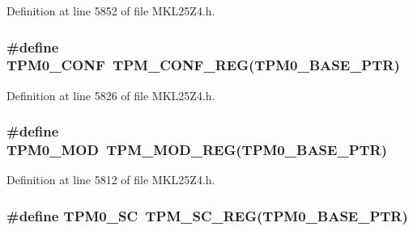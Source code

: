 Definition at line 5852 of file M\+K\+L25\+Z4.\+h.

\subsubsection[{\texorpdfstring{T\+P\+M0\+\_\+\+C\+O\+NF}{TPM0_CONF}}]{\setlength{\rightskip}{0pt plus 5cm}\#define T\+P\+M0\+\_\+\+C\+O\+NF~{\bf T\+P\+M\+\_\+\+C\+O\+N\+F\+\_\+\+R\+EG}({\bf T\+P\+M0\+\_\+\+B\+A\+S\+E\+\_\+\+P\+TR})}\hypertarget{group___t_p_m___register___accessor___macros_ga09ef091e6829f91a568ccc60793f802b}{}\label{group___t_p_m___register___accessor___macros_ga09ef091e6829f91a568ccc60793f802b}


Definition at line 5826 of file M\+K\+L25\+Z4.\+h.

\subsubsection[{\texorpdfstring{T\+P\+M0\+\_\+\+M\+OD}{TPM0_MOD}}]{\setlength{\rightskip}{0pt plus 5cm}\#define T\+P\+M0\+\_\+\+M\+OD~{\bf T\+P\+M\+\_\+\+M\+O\+D\+\_\+\+R\+EG}({\bf T\+P\+M0\+\_\+\+B\+A\+S\+E\+\_\+\+P\+TR})}\hypertarget{group___t_p_m___register___accessor___macros_ga05a02b85b7fe7838a90d03d66277ce1c}{}\label{group___t_p_m___register___accessor___macros_ga05a02b85b7fe7838a90d03d66277ce1c}


Definition at line 5812 of file M\+K\+L25\+Z4.\+h.

\subsubsection[{\texorpdfstring{T\+P\+M0\+\_\+\+SC}{TPM0_SC}}]{\setlength{\rightskip}{0pt plus 5cm}\#define T\+P\+M0\+\_\+\+SC~{\bf T\+P\+M\+\_\+\+S\+C\+\_\+\+R\+EG}({\bf T\+P\+M0\+\_\+\+B\+A\+S\+E\+\_\+\+P\+TR})}\hypertarget{group___t_p_m___register___accessor___macros_ga99b670f23bdc4dba03402182f90d62f1}{}\label{group___t_p_m___register___accessor___macros_ga99b670f23bdc4dba03402182f90d62f1}


